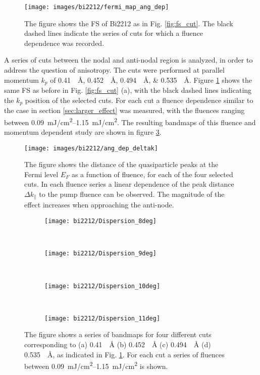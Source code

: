 \begin{figure}[t]
	\centering
	\texttt{[image: images/bi2212/fermi\_map\_ang\_dep]}
	\caption{The figure shows the FS of Bi2212 as in Fig. \ref{fig:fs_cut}. The black dashed lines indicate the series of cuts for which a fluence dependence was recorded.}
	\label{fig:fermimap_angdep}
\end{figure}

A series of cuts between the nodal and anti-nodal region is analyzed, in order to address the question of anisotropy.
The cuts were performed at parallel momentum $k_p$ of \qtylist{0.41;0.452;0.494;0.535}{\per\angstrom}.
Figure \ref{fig:fermimap_angdep} shows the same FS as before in Fig. \ref{fig:fs_cut} (a), with the black dashed lines indicating the $k_p$ position of the selected cuts.
For each cut a fluence dependence similar to the case in section \ref{sec:larger_effect} was measured, with the fluences ranging between \qtyrange{0.09}{1.15}{\milli\joule/\centi\meter\squared}.
The resulting bandmaps of this fluence and momentum dependent study are shown in figure \ref{fig:effect_angle}.

\begin{figure}[b!]
	\centering
	\texttt{[image: images/bi2212/ang\_dep\_deltak]}
	\caption{The figure shows the distance of the quasiparticle peaks at the Fermi level $E_F$ as a function of fluence, for each of the four selected cuts. In each fluence series a linear dependence of the peak distance $\Delta k_\parallel$ to the pump fluence can be observed. The magnitude of the effect increases when approaching the anti-node.}
	\label{fig:angdep_deltak}
\end{figure}

\begin{figure}[t!]
	\centering
	\begin{subfigure}[b]{0.95\textwidth}
		\texttt{[image: bi2212/Dispersion\_8deg]}
		\caption{}
	\end{subfigure}
	\\
	\begin{subfigure}[b]{0.95\textwidth}
		\texttt{[image: bi2212/Dispersion\_9deg]}
		\caption{}
	\end{subfigure}
	\\
	\begin{subfigure}[b]{0.95\textwidth}
		\texttt{[image: bi2212/Dispersion\_10deg]}
		\caption{}
	\end{subfigure}
	\\
	\begin{subfigure}[b]{0.95\textwidth}
		\texttt{[image: bi2212/Dispersion\_11deg]}
		\caption{}
	\end{subfigure}
	\caption{The figure shows a series of bandmaps for four different cuts corresponding to (a) \qty{0.41}{\per\angstrom} (b) \qty{0.452}{\per\angstrom} (c) \qty{0.494}{\per\angstrom} (d) \qty{0.535}{\per\angstrom}, as indicated in Fig. \ref{fig:fermimap_angdep}. For each cut a series of fluences between \qtyrange{0.09}{1.15}{\milli\joule/\centi\meter\squared} is shown.}
	\label{fig:effect_angle}
\end{figure}

